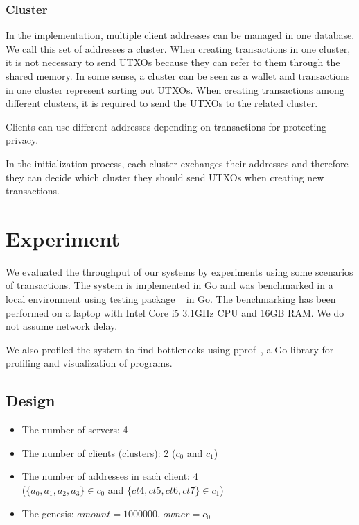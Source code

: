 \documentclass[a4paper, oneside]{discothesis}
\begin{document}
\subsection{Cluster}
In the implementation, multiple client addresses can be managed in one database.
We call this set of addresses a cluster.
When creating transactions in one cluster, it is not necessary to send UTXOs
because they can refer to them through the shared memory.
In some sense, a cluster can be seen as a wallet and transactions in one cluster
represent sorting out UTXOs.
When creating transactions among different clusters, it is required to send the UTXOs to the related cluster.

Clients can use different addresses depending on transactions for protecting privacy.

In the initialization process, each cluster exchanges their addresses and therefore they can decide which cluster they should send UTXOs when creating new transactions.


\chapter{Experiment}
We evaluated the throughput of our systems by experiments using some scenarios of transactions.
The system is implemented in Go and was benchmarked in a local environment
using testing package ~\cite{testing, flags} in Go.
The benchmarking has been performed on a laptop with Intel Core i5 3.1GHz CPU and 16GB RAM.
We do not assume network delay.

We also profiled the system to find bottlenecks using pprof~\cite{pprof, profiling},
a Go library for profiling and visualization of programs.

\section{Design}
\begin{itemize}
    \item The number of servers: 4
    \item The number of clients (clusters): 2 ($c_0$ and $c_1$)
    \item The number of addresses in each client: 4\\
        ($\{a_0, a_1, a_2, a_3\} \in c_0$ and $\{ct4, ct5, ct6, ct7\} \in c_1$)
    \item The genesis: $amount = 1000000$, $owner = c_0$
\end{itemize}
\end{document}
